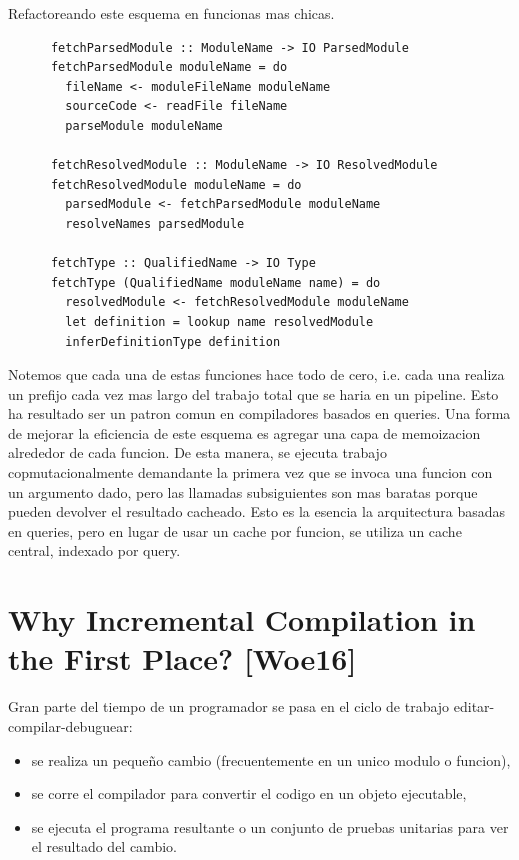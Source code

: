 \documentclass[12pt, a4paper]{report}
\begin{document}
      Refactoreando este esquema en funcionas mas chicas.

      \begin{verbatim}
      fetchParsedModule :: ModuleName -> IO ParsedModule
      fetchParsedModule moduleName = do
        fileName <- moduleFileName moduleName
        sourceCode <- readFile fileName
        parseModule moduleName

      fetchResolvedModule :: ModuleName -> IO ResolvedModule
      fetchResolvedModule moduleName = do
        parsedModule <- fetchParsedModule moduleName
        resolveNames parsedModule

      fetchType :: QualifiedName -> IO Type
      fetchType (QualifiedName moduleName name) = do
        resolvedModule <- fetchResolvedModule moduleName
        let definition = lookup name resolvedModule
        inferDefinitionType definition
      \end{verbatim}

      Notemos que cada una de estas funciones hace todo de cero, i.e. cada una realiza un prefijo cada vez mas largo del trabajo total que se haria en un pipeline.
      Esto ha resultado ser un patron comun en compiladores basados en queries.
      Una forma de mejorar la eficiencia de este esquema es agregar una capa de memoizacion alrededor de cada funcion.
      De esta manera, se ejecuta trabajo copmutacionalmente demandante la primera vez que se invoca una funcion con un argumento dado, pero las llamadas subsiguientes son mas baratas porque pueden devolver el resultado cacheado.
      Esto es la esencia la arquitectura basadas en queries, pero en lugar de usar un cache por funcion, se utiliza un cache central, indexado por query.
      \cite{olle_query_based}

  \section*{Why Incremental Compilation in the First Place? [Woe16]}

    Gran parte del tiempo de un programador se pasa en el ciclo de trabajo editar-compilar-debuguear:

    \begin{itemize}
    \item se realiza un pequeño cambio (frecuentemente en un unico modulo o funcion),
    \item se corre el compilador para convertir el codigo en un objeto ejecutable,
    \item se ejecuta el programa resultante o un conjunto de pruebas unitarias para ver el resultado del cambio.
    \end{itemize}
\end{document}
